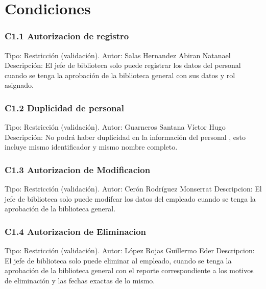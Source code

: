 \chapter{Condiciones}
\label{appendix:Condiciones}

\subsection{C1.1 Autorizacion de registro}
	\UCli Tipo: Restricción (validación).
	\UCli Autor: Salas Hernandez Abiran Natanael
	\UCli Descripción: El jefe de biblioteca solo puede registrar los datos del personal cuando se tenga la aprobación de la biblioteca general con sus datos y rol asignado.

\subsection{C1.2 Duplicidad de personal}
	\UCli Tipo: Restricción (validación).
	\UCli Autor: Guarneros Santana Víctor Hugo
	\UCli Descripción: No podrá haber duplicidad en la información del personal , esto incluye mismo identificador y mismo nombre completo.

\subsection{C1.3 Autorizacion de Modificacion}
	\UCli Tipo: Restricción (validación).
	\UCli Autor: Cerón Rodríguez Monserrat
	\UCli Descripcion: El jefe de biblioteca solo puede modifcar los datos del empleado cuando se tenga la aprobación de la biblioteca general.

\subsection{C1.4 Autorizacion de Eliminacion}
	\UCli Tipo: Restricción (validación).
	\UCli Autor: López Rojas Guillermo Eder 
	\UCli Descripcion: El jefe de biblioteca solo puede eliminar al empleado, cuando se tenga la aprobación de la biblioteca general con el reporte correspondiente a los motivos de eliminación y las fechas exactas de lo mismo.




